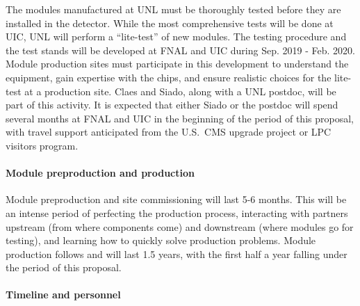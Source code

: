 The modules manufactured at UNL must be thoroughly tested before they are installed in the detector. While the most comprehensive tests will be done at UIC, UNL will perform a ``lite-test'' of new modules. The testing procedure and the test stands will be developed at FNAL and UIC during Sep. 2019 - Feb. 2020. Module production sites must participate in this development to understand the equipment, gain expertise with the chips, and ensure realistic choices for the lite-test at a production site. Claes and Siado, along with a UNL postdoc, will be part of this activity. It is expected that either Siado or the postdoc will spend several months at FNAL and UIC in the beginning of the period of this proposal, with travel support anticipated from the U.S.~CMS upgrade project or LPC visitors program.

\paragraph{Module preproduction and production}

Module preproduction and site commissioning will last 5-6 months. 
This will be an intense period of perfecting the production process, interacting with partners upstream (from where components come) and downstream (where modules go for testing), and learning how to quickly solve production problems. 
Module production follows and will last 1.5 years, with the first half a year falling under the period of this proposal.  

\paragraph{Timeline and personnel}

